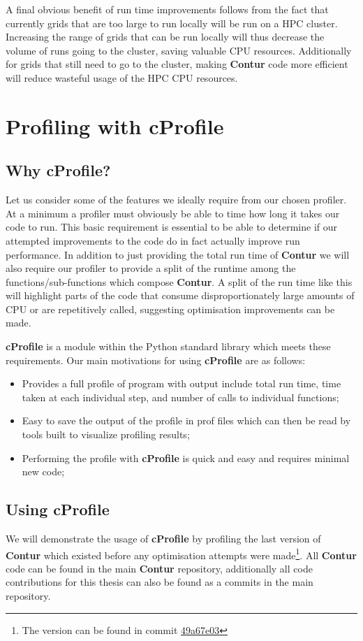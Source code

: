 A final obvious benefit of run time improvements follows from the fact that currently grids that are too large to run locally will be run on a HPC cluster. Increasing the range of grids that can be run locally will thus decrease the volume of runs going to the cluster, saving valuable CPU resources. Additionally for grids that still need to go to the cluster, making \textbf{Contur} code more efficient will reduce wasteful usage of the HPC CPU resources.

\section{Profiling with cProfile}

\subsection{Why cProfile?}
Let us consider some of the features we ideally require from our chosen profiler. At a minimum a profiler must obviously be able to time how long it takes our code to run. This basic requirement is essential to be able to determine if our attempted improvements to the code do in fact actually improve run performance. In addition to just providing the total run time of \textbf{Contur} we will also require our profiler to provide a split of the runtime among the functions/sub-functions which compose \textbf{Contur}. A split of the run time like this will highlight parts of the code that consume disproportionately large amounts of CPU or are repetitively called, suggesting optimisation improvements can be made.

\textbf{cProfile}\cite{cProfile} is a module within the Python standard library which meets these requirements. Our main motivations for using \textbf{cProfile} are as follows:

\begin{itemize}
\item Provides a full profile of program with output include total run time, time taken at each individual step, and number of calls to individual functions;
\item Easy to save the output of the profile in prof files which can then be read by tools built to visualize profiling results;
\item Performing the profile with \textbf{cProfile} is quick and easy and requires minimal new code;
\end{itemize}

\subsection{Using cProfile}
We will demonstrate the usage of \textbf{cProfile} by profiling the last version of \textbf{Contur} which existed before any optimisation attempts were made\footnote{The version can be found in commit \href{https://gitlab.com/hepcedar/contur/-/tree/49a67e039cf93c88b39dade3dfb7c5f03e780fb2}{49a67e03}}. All \textbf{Contur} code can be found in the main \textbf{Contur} repository\cite{contur_main}, additionally all code contributions for this thesis can also be found as a commits in the main repository. 

